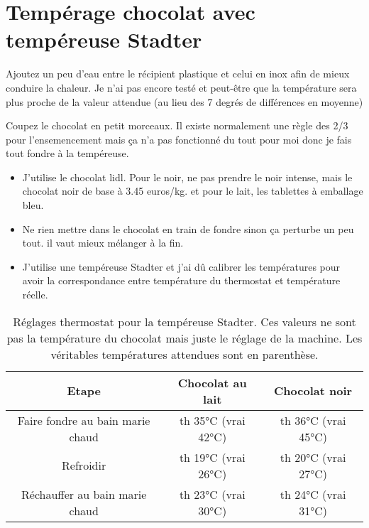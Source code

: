 \documentclass[a4paper,twoside,openright]{report}
\begin{document}
\section{Tempérage chocolat avec tempéreuse Stadter}\label{sec:tempereuse}

\begin{attention}
Ajoutez un peu d'eau entre le récipient plastique et celui en inox afin de mieux conduire la chaleur. Je n'ai pas encore testé et peut-être que la température sera plus proche de la valeur attendue (au lieu des 7 degrés de différences en moyenne)
\end{attention}


Coupez le chocolat en petit morceaux. Il existe normalement une règle des 2/3 pour l'ensemencement mais ça n'a pas fonctionné du tout pour moi donc je fais tout fondre à la tempéreuse.
\begin{remarque}
\begin{itemize}
\item J'utilise le chocolat lidl. Pour le noir, ne pas prendre le noir intense, mais le chocolat noir de base à 3.45 euros/kg. et pour le lait, les tablettes à emballage bleu.
\item Ne rien mettre dans le chocolat en train de fondre sinon ça perturbe un peu tout. il vaut mieux mélanger à la fin.
\item J'utilise une tempéreuse Stadter et j'ai dû calibrer les températures pour avoir la correspondance entre température du thermostat et température réelle.
\end{itemize}
\end{remarque}

\begin{table}[hb]
\centering
\begin{tabular}{|c|c|c|}
\hline 
Etape & Chocolat au lait & Chocolat noir \\\hline
Faire fondre au bain marie chaud & th 35°C (vrai 42°C)   & th 36°C (vrai 45°C) \\\hline
Refroidir                        & th 19°C (vrai 26°C)   & th 20°C (vrai 27°C)   \\\hline
Réchauffer au bain marie chaud   & th 23°C (vrai 30°C)   & th 24°C (vrai 31°C)   \\\hline
\end{tabular} 
\caption{Réglages thermostat pour la tempéreuse Stadter. Ces valeurs ne sont pas la température du chocolat mais juste le réglage de la machine. Les véritables températures attendues sont en parenthèse.}
\end{table}
\end{document}
